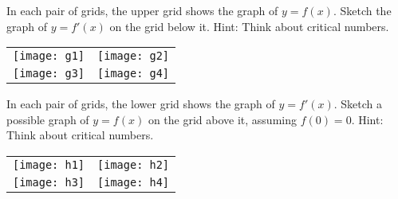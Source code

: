 
In each pair of grids, the upper grid shows the graph of $y = f(x)$.
Sketch the graph of $y = f'(x)$ on the grid below it.
Hint: Think about critical numbers.

{
\newcommand{\PicWidth}{3.25in}
\begin{tabular}{p{\PicWidth}p{\PicWidth}}
  \texttt{[image: g1]}
  & \texttt{[image: g2]}
  \\[0.25in]
  \texttt{[image: g3]}
  & \texttt{[image: g4]}
\end{tabular}
}

\newpage

In each pair of grids, the lower grid shows the graph of $y = f'(x)$.
Sketch a possible graph of $y = f(x)$ on the grid above it, assuming $f(0) = 0$.
Hint: Think about critical numbers.

{
\newcommand{\PicWidth}{3.25in}
\begin{tabular}{p{\PicWidth}p{\PicWidth}}
  \texttt{[image: h1]}
  & \texttt{[image: h2]}
  \\[0.25in]
  \texttt{[image: h3]}
  & \texttt{[image: h4]}
\end{tabular}
}

